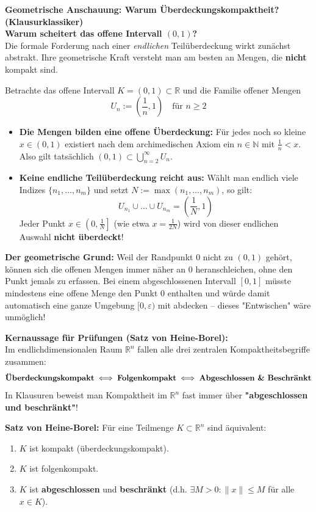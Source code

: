 \begin{remark}
    \textbf{Geometrische Anschauung: Warum Überdeckungskompaktheit? (Klausurklassiker)} \\
    \textbf{Warum scheitert das offene Intervall $(0, 1)$?} \\
    Die formale Forderung nach einer \textit{endlichen} Teilüberdeckung wirkt zunächst abstrakt. Ihre geometrische Kraft versteht man am besten an Mengen, die \textbf{nicht} kompakt sind.
    
    Betrachte das offene Intervall $K = (0, 1) \subset \mathbb{R}$ und die Familie offener Mengen
    $$ U_n := \left( \frac{1}{n}, 1 \right) \quad \text{für } n \ge 2 $$
    \begin{itemize}
        \item \textbf{Die Mengen bilden eine offene Überdeckung:} Für jedes noch so kleine $x \in (0, 1)$ existiert nach dem archimedischen Axiom ein $n \in \mathbb{N}$ mit $\frac{1}{n} < x$. Also gilt tatsächlich $(0, 1) \subset \bigcup_{n=2}^\infty U_n$.
        \item \textbf{Keine endliche Teilüberdeckung reicht aus:} Wählt man endlich viele Indizes $\{n_1, \dots, n_m\}$ und setzt $N := \max(n_1, \dots, n_m)$, so gilt:
        $$ U_{n_1} \cup \dots \cup U_{n_m} = \left( \frac{1}{N}, 1 \right) $$
        Jeder Punkt $x \in \left( 0, \frac{1}{N} \right]$ (wie etwa $x = \frac{1}{2N}$) wird von dieser endlichen Auswahl \textbf{nicht überdeckt}!
    \end{itemize}
    \textbf{Der geometrische Grund:} Weil der Randpunkt $0$ nicht zu $(0, 1)$ gehört, können sich die offenen Mengen immer näher an $0$ heranschleichen, ohne den Punkt jemals zu erfassen. Bei einem abgeschlossenen Intervall $[0, 1]$ müsste mindestens eine offene Menge den Punkt $0$ enthalten und würde damit automatisch eine ganze Umgebung $[0, \varepsilon)$ mit abdecken – dieses "Entwischen" wäre unmöglich!

    \textbf{Kernaussage für Prüfungen (Satz von Heine-Borel):} \\
    Im endlichdimensionalen Raum $\mathbb{R}^n$ fallen alle drei zentralen Kompaktheitsbegriffe zusammen:
    $$ \text{\textbf{Überdeckungskompakt}} \iff \text{\textbf{Folgenkompakt}} \iff \text{\textbf{Abgeschlossen \& Beschränkt}} $$
    In Klausuren beweist man Kompaktheit im $\mathbb{R}^n$ fast immer über \textbf{"abgeschlossen und beschränkt"}!
\end{remark}

\begin{theorem}
    \textbf{Satz von Heine-Borel:} Für eine Teilmenge $K \subset \mathbb{R}^n$ sind äquivalent:
    \begin{enumerate}
        \item $K$ ist kompakt (überdeckungskompakt).
        \item $K$ ist folgenkompakt.
        \item $K$ ist \textbf{abgeschlossen} und \textbf{beschränkt} (d.h. $\exists M > 0: \|x\| \le M$ für alle $x \in K$).
    \end{enumerate}
\end{theorem}